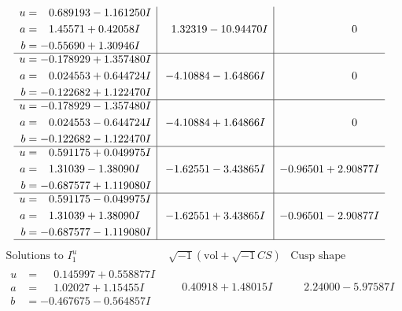 \documentclass[1p]{elsarticle_modified}
\theoremstyle{definition}
\newcommand{\I}{\sqrt{-1}}
\begin{document}
$$\begin{array}{c|c|c}
\begin{aligned}
u &= \phantom{-}0.689193 - 1.161250 I \\
a &= \phantom{-}1.45571 + 0.42058 I \\
b &= -0.55690 + 1.30946 I\end{aligned}
 & \phantom{-}1.32319 - 10.94470 I & \phantom{-0.000000 } 0 \\ \hline\begin{aligned}
u &= -0.178929 + 1.357480 I \\
a &= \phantom{-}0.024553 + 0.644724 I \\
b &= -0.122682 + 1.122470 I\end{aligned}
 & -4.10884 - 1.64866 I & \phantom{-0.000000 } 0 \\ \hline\begin{aligned}
u &= -0.178929 - 1.357480 I \\
a &= \phantom{-}0.024553 - 0.644724 I \\
b &= -0.122682 - 1.122470 I\end{aligned}
 & -4.10884 + 1.64866 I & \phantom{-0.000000 } 0 \\ \hline\begin{aligned}
u &= \phantom{-}0.591175 + 0.049975 I \\
a &= \phantom{-}1.31039 - 1.38090 I \\
b &= -0.687577 + 1.119080 I\end{aligned}
 & -1.62551 - 3.43865 I & -0.96501 + 2.90877 I \\ \hline\begin{aligned}
u &= \phantom{-}0.591175 - 0.049975 I \\
a &= \phantom{-}1.31039 + 1.38090 I \\
b &= -0.687577 - 1.119080 I\end{aligned}
 & -1.62551 + 3.43865 I & -0.96501 - 2.90877 I\\
 \hline 
 \end{array}$$\newpage$$\begin{array}{c|c|c}  
\text{Solutions to }I^u_{1}& \I (\text{vol} + \sqrt{-1}CS) & \text{Cusp shape}\\
 \hline 
\begin{aligned}
u &= \phantom{-}0.145997 + 0.558877 I \\
a &= \phantom{-}1.02027 + 1.15455 I \\
b &= -0.467675 - 0.564857 I\end{aligned}
 & \phantom{-}0.40918 + 1.48015 I & \phantom{-}2.24000 - 5.97587 I \\ \hline\begin{aligned}

\end{aligned}
\end{array}$$
\end{document}
